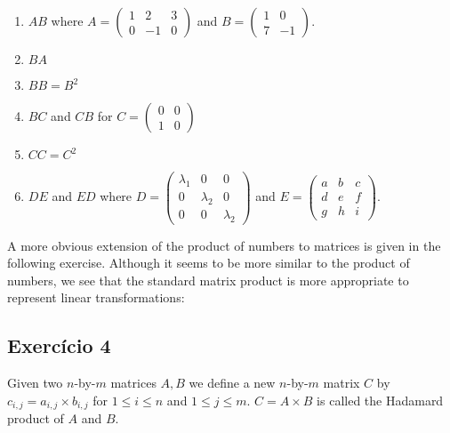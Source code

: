 \begin{enumerate}
\item $AB$ where $A = \begin{pmatrix}
  1 & 2 & 3 \\
  0 & -1 & 0
    \end{pmatrix}$ and $B = \begin{pmatrix}
  1 & 0 \\
  7 & -1 \end{pmatrix}$.
\item $BA$
\item $BB=B^2$
\item $BC$ and $CB$ for $C = \begin{pmatrix}
  0 & 0 \\
  1 & 0
\end{pmatrix}$
\item $CC = C^2$
\item $DE$ and $ED$ where $D = \begin{pmatrix}
  \lambda_1 & 0 & 0\\
  0 & \lambda_2 & 0 \\
  0 & 0 & \lambda_2\end{pmatrix}$
  and $E =
  \begin{pmatrix}
  a & b & c\\
  d & e & f \\
  g & h & i\end{pmatrix}$.

\end{enumerate}

A more obvious extension of the product of numbers to matrices is given in
the following exercise. Although it seems to be more similar to the product of
numbers, we see that the standard matrix product is more appropriate to
represent linear transformations:

\subsection*{Exercício 4}

Given two $n$-by-$m$ matrices $A, B$ we define a new $n$-by-$m$ matrix $C$
by $c_{i,j} = a_{i,j} \times b_{i,j}$ for $1 \leq i \leq n$ and $1 \leq j \leq m$.
$C = A \times B$ is called the Hadamard product of $A$ and $B$.

